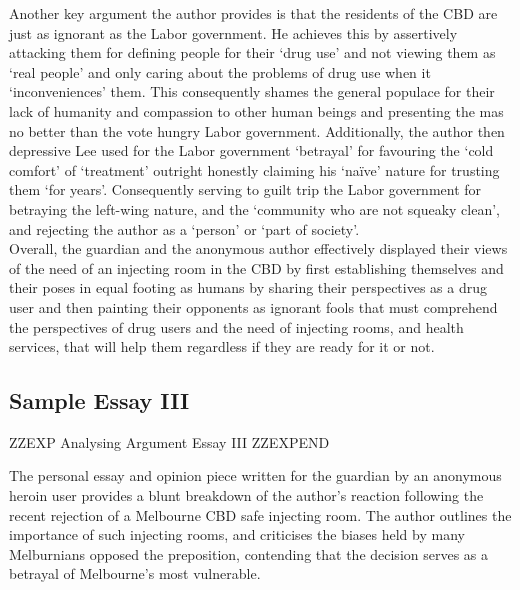 \documentclass[a4paper]{article}
\begin{document}
Another key argument the author provides is that the residents of the CBD are just as ignorant as the Labor government. He achieves this by assertively attacking them for defining people for their ‘drug use’ and not viewing them as ‘real people’ and only caring about the problems of drug use when it ‘inconveniences’ them. This consequently shames the general populace for their lack of humanity and compassion to other human beings and presenting the mas no better than the vote hungry Labor government. Additionally, the author then depressive Lee used for the Labor government ‘betrayal’ for favouring the ‘cold comfort’ of ‘treatment’ outright honestly claiming his ‘naïve’ nature for trusting them ‘for years’. Consequently serving to guilt trip the Labor government for betraying the left-wing nature, and the ‘community who are not squeaky clean’, and rejecting the author as a ‘person’ or ‘part of society’.\\

Overall, the guardian and the anonymous author effectively displayed their views of the need of an injecting room in the CBD by first establishing themselves and their poses in equal footing as humans by sharing their perspectives as a drug user and then painting their opponents as ignorant fools that must comprehend the perspectives of drug users and the need of injecting rooms, and health services, that will help them regardless if they are ready for it or not.\\

\newpage
\subsection{Sample Essay III}


ZZEXP Analysing Argument Essay III ZZEXPEND


The personal essay and opinion piece written for the guardian by an anonymous heroin user provides a blunt breakdown of the author's reaction following the recent rejection of a Melbourne CBD safe injecting room. The author outlines the importance of such injecting rooms, and criticises the biases held by many Melburnians opposed the preposition, contending that the decision serves as a betrayal of Melbourne’s most vulnerable.\\
\end{document}
